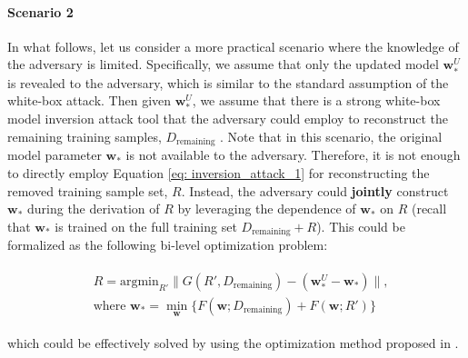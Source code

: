 \documentclass[11pt]{article}
\newcommand{\uw}{\textbf{w}^{U}}
\newcommand{\w}{\textbf{w}}
\newcommand{\x}{\textbf{x}}
\newcommand{\y}{y}
\begin{document}
\paragraph{Scenario 2} In what follows, let us consider a more practical scenario where the knowledge of the adversary is limited. Specifically, we assume that only the updated model $\uw_*$ is revealed to the adversary, which is similar to the standard assumption of the white-box attack. Then given $\uw_*$, we assume that there is a strong white-box model inversion attack tool that the adversary could employ to reconstruct the remaining training samples, $D_{\text{remaining}}$ \cite{fredrikson2015model}. Note that in this scenario, the original model parameter $\w_*$ is not available to the adversary. Therefore, it is not enough to directly employ Equation \eqref{eq: inversion_attack_1} for reconstructing the removed training sample set, $R$. Instead, the adversary could \textbf{jointly} construct $\w_*$ during the derivation of $R$ by leveraging the dependence of $\w_*$ on $R$ (recall that $\w_*$ is trained on the full training set $D_{\text{remaining}} + R$). This could be formalized as the following bi-level optimization problem:
\begin{small}
\begin{align}
    \begin{split}
        &R = \text{argmin}_{R'}\|G(R', D_{\text{remaining}}) - (\uw_* - \w_*)\|,\\
        &\text{where }\w_* = \min_{\w}\{ F(\w; D_{\text{remaining}}) + F(\w; R')\}
    \end{split}
\end{align}
\end{small}
\noindent
which could be effectively solved by using the optimization method proposed in \cite{shu2019meta}.





\end{document}
